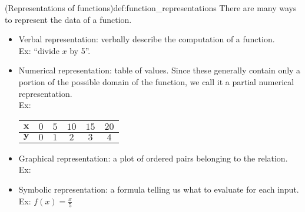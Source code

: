 \documentclass{article}
\begin{document}
\begin{definition}{(Representations of functions)}{def:function_representations}
    There are many ways to represent the data of a function.
    \begin{itemize}
        \item Verbal representation: verbally describe the computation of a function.\\ Ex: ``divide $x$ by 5''.
        \item Numerical representation: table of values. Since these generally contain only a portion of the possible domain of the function, we call it a partial numerical representation.\\ Ex:
            \begin{center} 
            \begin{tabular}{|c|c|c|c|c|c|} \hline
                 $\mathbf{x}$ & $0$ & $5$ & $10$ & $15$ & $20$ \\ \hline
                 $\mathbf{y}$ & $0$ & $1$ & $2$ & $3$ & $4$ \\ \hline
            \end{tabular}\end{center}
        \item Graphical representation: a plot of ordered pairs belonging to the relation.\\Ex:
        \begin{center}\end{center}
        \item Symbolic representation: a formula telling us what to evaluate for each input.\\Ex: $f(x)=\frac{x}{5}$
    \end{itemize}
\end{definition}
\end{document}
